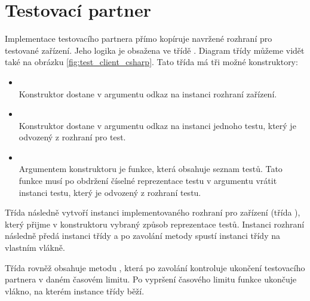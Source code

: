 \section{Testovací partner}
Implementace testovacího partnera přímo kopíruje navržené rozhraní pro testované zařízení. Jeho logika je obsažena ve třídě . Diagram třídy můžeme vidět také na obrázku \ref{fig:test_client_csharp}. Tato třída má tři možné konstruktory:

\begin{itemize} 
    \item {} \\
    Konstruktor dostane v argumentu odkaz na instanci rozhraní zařízení.
    \item {} \\
    Konstruktor dostane v argumentu odkaz na instanci jednoho testu, který je odvozený z rozhraní pro test.
    \item {} \\
    Argumentem konstruktoru je funkce, která obsahuje seznam testů. Tato funkce musí po obdržení číselné reprezentace testu v argumentu vrátit instanci testu, který je odvozený z rozhraní testu.
\end{itemize}

Třída následně vytvoří instanci implementovaného rozhraní pro zařízení (třída ), který přijme v konstruktoru vybraný způsob reprezentace testů. Instanci rozhraní následně předá instanci třídy  a po zavolání metody  spustí instanci třídy  na vlastním vlákně.

Třída rovněž obsahuje metodu , která po zavolání kontroluje ukončení testovacího partnera v daném časovém limitu. Po vypršení časového limitu funkce ukončuje vlákno, na kterém instance třídy  běží.

